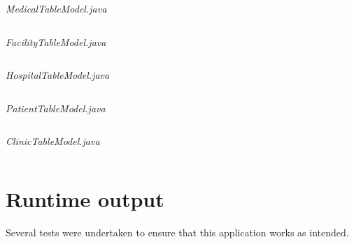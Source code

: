 \documentclass{article}
\begin{document}
\textit{MedicalTableModel.java}
\inputminted{java}{./src/main/java/com/yvesstraten/medicalconsolegui/models/MedicalTableModel.java}


\textit{FacilityTableModel.java}
\inputminted{java}{./src/main/java/com/yvesstraten/medicalconsolegui/models/FacilityTableModel.java}

\textit{HospitalTableModel.java}
\inputminted{java}{./src/main/java/com/yvesstraten/medicalconsolegui/models/HospitalTableModel.java}

\textit{PatientTableModel.java}
\inputminted{java}{./src/main/java/com/yvesstraten/medicalconsolegui/models/PatientTableModel.java}

\textit{ClinicTableModel.java}
\inputminted{java}{./src/main/java/com/yvesstraten/medicalconsolegui/models/ClinicTableModel.java}

\section{Runtime output}\label{sec:runtime_output} %
Several tests were undertaken to ensure that this application works as intended.

\end{document}
